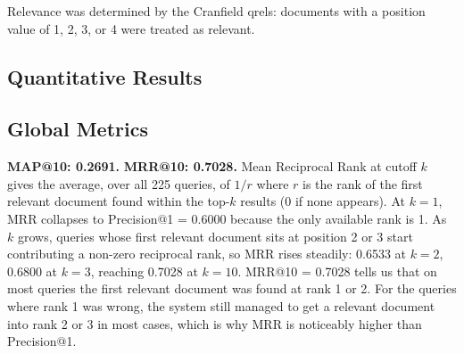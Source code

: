 \documentclass{article}
\begin{document}
Relevance was determined by the Cranfield qrels: documents with a position value of 1, 2, 3, or 4 were treated as relevant.

\subsection{Quantitative Results}

\begin{table}[H]
\centering
\renewcommand{\arraystretch}{1.25}
\caption{VSM Baseline evaluation metrics averaged over all 225 Cranfield queries.}
\label{tab:baseline}
\end{table}

\subsection{Global Metrics}

\textbf{MAP@10: 0.2691.} \quad \textbf{MRR@10: 0.7028.}
Mean Reciprocal Rank at cutoff $k$ gives the average, over all 225 queries, of $1/r$ where $r$ is the rank of the first relevant document found within the top-$k$ results (0 if none appears). At $k{=}1$, MRR collapses to Precision@1 = 0.6000 because the only available rank is 1. As $k$ grows, queries whose first relevant document sits at position 2 or 3 start contributing a non-zero reciprocal rank, so MRR rises steadily: 0.6533 at $k{=}2$, 0.6800 at $k{=}3$, reaching 0.7028 at $k{=}10$. MRR@10 = 0.7028 tells us that on most queries the first relevant document was found at rank 1 or 2. For the queries where rank 1 was wrong, the system still managed to get a relevant document into rank 2 or 3 in most cases, which is why MRR is noticeably higher than Precision@1.
\end{document}
